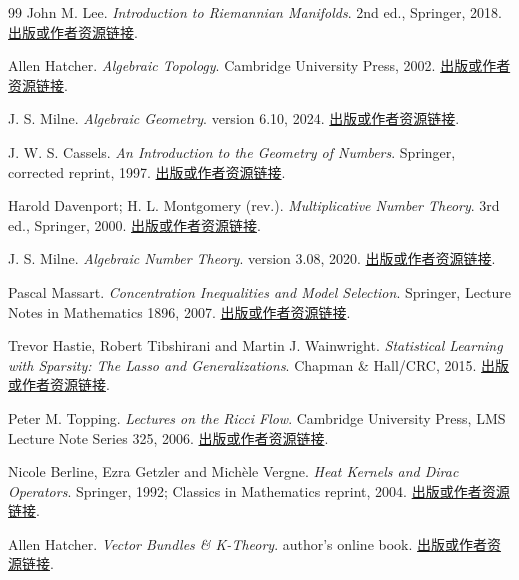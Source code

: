 \begin{thebibliography}{99}
 John M. Lee. \emph{Introduction to Riemannian Manifolds}. 2nd ed., Springer, 2018. \href{https://sites.math.washington.edu/~lee/Books/RM/}{出版或作者资源链接}.

 Allen Hatcher. \emph{Algebraic Topology}. Cambridge University Press, 2002. \href{https://pi.math.cornell.edu/~hatcher/AT/ATpage.html}{出版或作者资源链接}.

 J. S. Milne. \emph{Algebraic Geometry}. version 6.10, 2024. \href{https://www.jmilne.org/math/CourseNotes/ag.html}{出版或作者资源链接}.

 J. W. S. Cassels. \emph{An Introduction to the Geometry of Numbers}. Springer, corrected reprint, 1997. \href{https://doi.org/10.1007/978-3-642-62035-5}{出版或作者资源链接}.

 Harold Davenport; H. L. Montgomery (rev.). \emph{Multiplicative Number Theory}. 3rd ed., Springer, 2000. \href{https://link.springer.com/book/9780387950976}{出版或作者资源链接}.

 J. S. Milne. \emph{Algebraic Number Theory}. version 3.08, 2020. \href{https://www.jmilne.org/math/CourseNotes/ANT.pdf}{出版或作者资源链接}.

 Pascal Massart. \emph{Concentration Inequalities and Model Selection}. Springer, Lecture Notes in Mathematics 1896, 2007. \href{https://doi.org/10.1007/978-3-540-48503-2}{出版或作者资源链接}.

 Trevor Hastie, Robert Tibshirani and Martin J. Wainwright. \emph{Statistical Learning with Sparsity: The Lasso and Generalizations}. Chapman \& Hall/CRC, 2015. \href{https://wainwrigwork.github.io/publications.html}{出版或作者资源链接}.

 Peter M. Topping. \emph{Lectures on the Ricci Flow}. Cambridge University Press, LMS Lecture Note Series 325, 2006. \href{https://warwick.ac.uk/fac/sci/maths/people/staff/peter_topping/rfnotes/}{出版或作者资源链接}.

 Nicole Berline, Ezra Getzler and Michèle Vergne. \emph{Heat Kernels and Dirac Operators}. Springer, 1992; Classics in Mathematics reprint, 2004. \href{https://doi.org/10.1007/978-3-642-58088-8}{出版或作者资源链接}.

 Allen Hatcher. \emph{Vector Bundles \& K-Theory}. author's online book. \href{https://pi.math.cornell.edu/~hatcher/VBKT/VBpage.html}{出版或作者资源链接}.


\end{thebibliography}
